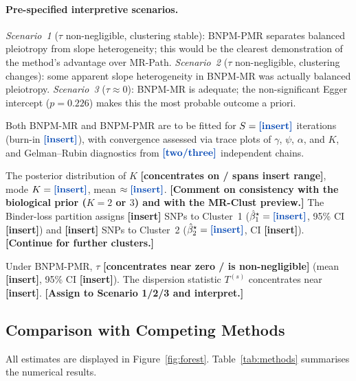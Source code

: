 \documentclass[12pt,a4paper]{article}
\newcommand{\bs}{\beta^{\star}}
\newcommand{\placeholder}[1]{\textcolor{fcblue}{\textbf{[#1]}}}
\begin{document}
\paragraph{Pre-specified interpretive scenarios.}
\emph{Scenario~1} ($\tau$ non-negligible, clustering stable): BNPM-PMR
separates balanced pleiotropy from slope heterogeneity; this would be the
clearest demonstration of the method's advantage over MR-Path.
\emph{Scenario~2} ($\tau$ non-negligible, clustering changes): some
apparent slope heterogeneity in BNPM-MR was actually balanced pleiotropy.
\emph{Scenario~3} ($\tau \approx 0$): BNPM-MR is adequate; the
non-significant Egger intercept ($p = 0.226$) makes this the most
probable outcome a priori.

Both BNPM-MR and BNPM-PMR are to be fitted for $S = \placeholder{insert}$
iterations (burn-in $\placeholder{insert}$), with convergence assessed via
trace plots of $\gamma$, $\psi$, $\alpha$, and $K$, and Gelman--Rubin
diagnostics from $\placeholder{two/three}$ independent chains.

The posterior distribution of $K$ \placeholder{concentrates on / spans
insert range}, mode $K = \placeholder{insert}$, mean $\approx
\placeholder{insert}$.  \placeholder{Comment on consistency with the
biological prior ($K = 2$ or $3$) and with the MR-Clust preview.}
The Binder-loss partition assigns \placeholder{insert} SNPs to Cluster~1
($\hat\bs_1 = \placeholder{insert}$, 95\% CI \placeholder{insert}) and
\placeholder{insert} SNPs to Cluster~2 ($\hat\bs_2 = \placeholder{insert}$,
CI \placeholder{insert}).  \placeholder{Continue for further clusters.}

Under BNPM-PMR, $\tau$ \placeholder{concentrates near zero / is
non-negligible} (mean \placeholder{insert}, 95\% CI \placeholder{insert}).
The dispersion statistic $T^{(s)}$ concentrates near \placeholder{insert}.
\placeholder{Assign to Scenario 1/2/3 and interpret.}

\subsection{Comparison with Competing Methods}
\label{sec:whr:competing}

All estimates are displayed in Figure~\ref{fig:forest}.
Table~\ref{tab:methods} summarises the numerical results.
\end{document}
